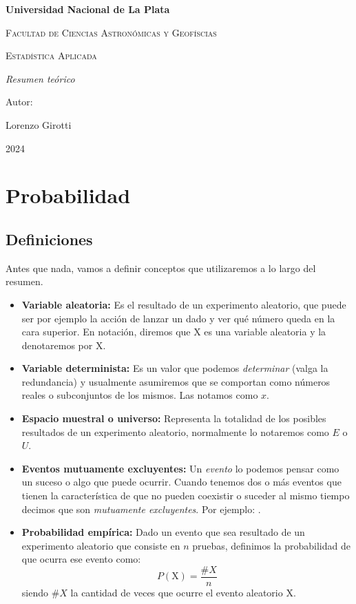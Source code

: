 \documentclass[openany]{book}
\begin{document}
\begin{titlepage}
	\centering
	{\bfseries\LARGE Universidad Nacional de La Plata \par}
	\vspace{1cm}
	{\scshape\Large Facultad de Ciencias Astronómicas y Geofíscias \par}
	\vspace{3cm}
	{\scshape\Huge Estadística Aplicada \par}
	\vspace{3cm}
	{\itshape\Large Resumen teórico \par}
	\vfill
	{\Large Autor: \par}
	{\Large Lorenzo Girotti \par}
	\vfill
	{\Large 2024 \par}
\end{titlepage}
\sffamily
\chapter{Probabilidad}
\section{Definiciones}
Antes que nada, vamos a definir conceptos que utilizaremos a lo largo del resumen.
\begin{itemize}
  \item \textbf{Variable aleatoria:} Es el resultado de un experimento aleatorio, que puede ser por ejemplo la acción de lanzar un dado y ver qué número queda en la cara superior. En notación, diremos que X es una variable aleatoria y la denotaremos por $\mathrm{X}$.
  \item \textbf{Variable determinista:} Es un valor que podemos \emph{determinar} (valga la redundancia) y usualmente asumiremos que se comportan como números reales o subconjuntos de los mismos. Las notamos como $x$.
  \item \textbf{Espacio muestral o universo:} Representa la totalidad de los posibles resultados de un experimento aleatorio, normalmente lo notaremos como $E$ o $U$.
  \item \textbf{Eventos mutuamente excluyentes:} Un \emph{evento} lo podemos pensar como un suceso o algo que puede ocurrir. Cuando tenemos dos o más eventos que tienen la característica de que no pueden coexistir o suceder al mismo tiempo decimos que son \emph{mutuamente excluyentes}. Por ejemplo: .
  \item \rm{\textbf{Probabilidad empírica:} Dado un evento que sea resultado de un experimento aleatorio que consiste en $n$ pruebas, definimos la probabilidad de que ocurra ese evento como:
  \begin{equation}
    \label{eq:prob-emp}
    P(\mathrm{X})=\frac{\#X}{n}
  \end{equation}
		siendo $\#X$ la cantidad de veces que ocurre el evento aleatorio $\mathrm{X}$.} 
\end{itemize}
\end{document}

